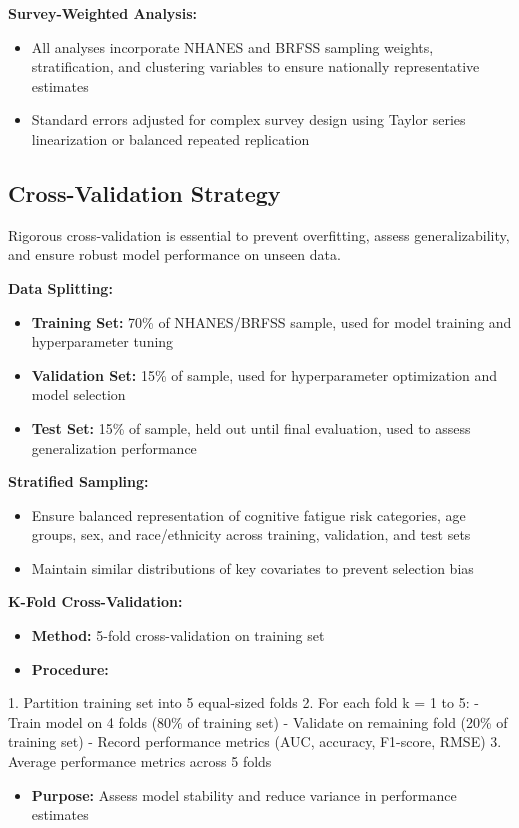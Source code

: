 \documentclass[journal,twoside,10pt]{IEEEtran}
\begin{document}
\textbf{Survey-Weighted Analysis:}
\begin{itemize}
\item All analyses incorporate NHANES and BRFSS sampling weights, stratification, and clustering variables to ensure nationally representative estimates
\item Standard errors adjusted for complex survey design using Taylor series linearization or balanced repeated replication
\end{itemize}

\subsection{Cross-Validation Strategy}

Rigorous cross-validation is essential to prevent overfitting, assess generalizability, and ensure robust model performance on unseen data.

\textbf{Data Splitting:}
\begin{itemize}
\item \textbf{Training Set:} 70\% of NHANES/BRFSS sample, used for model training and hyperparameter tuning
\item \textbf{Validation Set:} 15\% of sample, used for hyperparameter optimization and model selection
\item \textbf{Test Set:} 15\% of sample, held out until final evaluation, used to assess generalization performance
\end{itemize}

\textbf{Stratified Sampling:}
\begin{itemize}
\item Ensure balanced representation of cognitive fatigue risk categories, age groups, sex, and race/ethnicity across training, validation, and test sets
\item Maintain similar distributions of key covariates to prevent selection bias
\end{itemize}

\textbf{K-Fold Cross-Validation:}
\begin{itemize}
\item \textbf{Method:} 5-fold cross-validation on training set
\item \textbf{Procedure:}
\end{itemize}
  1. Partition training set into 5 equal-sized folds
  2. For each fold k = 1 to 5:
     - Train model on 4 folds (80\% of training set)
     - Validate on remaining fold (20\% of training set)
     - Record performance metrics (AUC, accuracy, F1-score, RMSE)
  3. Average performance metrics across 5 folds
\begin{itemize}
\item \textbf{Purpose:} Assess model stability and reduce variance in performance estimates
\end{itemize}
\end{document}
